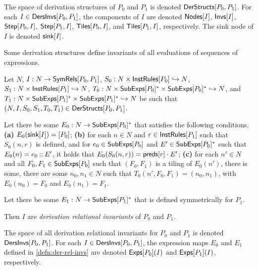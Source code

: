 %
The space of derivation structures of $P_0$ and $P_1$ is denoted
$\mathsf{DerStructs}[ P_0, P_1 ]$.
%
For each $I \in \mathsf{DersInvs}[ P_0, P_1 ]$, the components of $I$ are
denoted $\mathsf{Nodes}[ I ]$, $\mathsf{Invs}[ I ]$, $\mathsf{Step}[ P_0, I ]$,
$\mathsf{Step}[ P_1, I ]$, $\mathsf{Tiles}[ P_0, I ]$, and $\mathsf{Tiles}[ P_1, I ]$,
respectively.
%
The sink node of $I$ is denoted $\mathsf{sink}[ I ]$.

Some derivation structures define invariants of all evaluations of
sequences of expressions.
\begin{defn}
  \label{defn:der-rel-invs}
  Let $N$, $I : N \to \mathsf{SymRels}[ P_0, P_1 ]$, %
  $S_0 : N \times \mathsf{InstRules}[ P_0 ] \hookrightarrow N$, %
  $S_1 : N \times \mathsf{InstRules}[ P_1 ] \hookrightarrow N$, %
  $T_0 : N \times \mathsf{SubExps}[ P_0 ]^{*} \times \mathsf{SubExps}[ P_0 ]^{*} \hookrightarrow
  N$, and %
  $T_1 : N \times \mathsf{SubExps}[ P_1 ]^{*} \times \mathsf{SubExps}[ P_1 ]^{*} \hookrightarrow
  N$ be such that $(N, I, S_0, S_1, T_0, T_1) \in
  \mathsf{DerStructs}[ P_0, P_1 ]$.

  Let there be some $E_0 : N \to \mathsf{SubExps}[ P_0 ]^{*}$ that satisfies the
  following conditions.
  \textbf{(a)} $E_0(\mathsf{sink}[ I ]) = [ P_0 ]$;
  \textbf{(b)} for each $n \in N$ and $r \in \mathsf{InstRules}[ P_1 ]$ such
  that $S_0(n, r)$ is defined, and for $e_0 \in \mathsf{SubExps}[ P_0 ]$ and $E'
  \in \mathsf{SubExps}[ P_0 ]^{*}$ such that $E_0(n) = e_0 \mathbin{::} E'$, it holds
  that $E_0( S_0(n, r) ) = \mathsf{preds}[ r ] \cdot E'$;
  \textbf{(c)} for each $n' \in N$ and all $F_0, F_1 \in
  \mathsf{SubExps}[ P_0 ]$ such that $(F_0, F_1)$ is a tiling of $E_0(n')$,
  there is some, there are some $n_0, n_1 \in N$ such that $T_0(n',
  F_0, F_1) = (n_0, n_1)$, with $E_0(n_0) = F_0$ and $E_0(n_1) =
  F_1$.

  Let there be some $E_1 : N \to \mathsf{SubExps}[ P_1 ]^{*}$ that is defined
  symmetrically for $P_1$.

  Then $I$ are \emph{derivation relational invariants} of $P_0$ and
  $P_1$.
\end{defn}
%
The space of all derivation relational invariants for $P_0$ and $P_1$
is denoted $\mathsf{DersInvs}[ P_0, P_1 ]$.
%
For each $I \in \mathsf{DersInvs}[ P_0, P_1 ]$, the expression maps $E_0$ and
$E_1$ defined in \autoref{defn:der-rel-invs} are denoted
$\mathsf{Exps}[ P_0 ]( I )$ and $\mathsf{Exps}[ P_1 ]( I )$, respectively.
%

